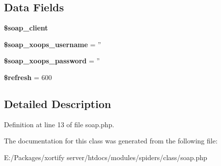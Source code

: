 \subsection*{Data Fields}
\begin{DoxyCompactItemize}
\item 
\hypertarget{class_s_o_a_p_spiders_exchange_a18c3d5ef7b606d5f21c8fda9d08e8c7e}{{\bfseries \$soap\-\_\-client}}\label{class_s_o_a_p_spiders_exchange_a18c3d5ef7b606d5f21c8fda9d08e8c7e}

\item 
\hypertarget{class_s_o_a_p_spiders_exchange_ab46ae973f580890282bce8dbe346abab}{{\bfseries \$soap\-\_\-xoops\-\_\-username} = ''}\label{class_s_o_a_p_spiders_exchange_ab46ae973f580890282bce8dbe346abab}

\item 
\hypertarget{class_s_o_a_p_spiders_exchange_ac116a126fa48c572acc0a859f42fa8dc}{{\bfseries \$soap\-\_\-xoops\-\_\-password} = ''}\label{class_s_o_a_p_spiders_exchange_ac116a126fa48c572acc0a859f42fa8dc}

\item 
\hypertarget{class_s_o_a_p_spiders_exchange_a8527f826b6959aaa92b0e51ee427ba1a}{{\bfseries \$refresh} = 600}\label{class_s_o_a_p_spiders_exchange_a8527f826b6959aaa92b0e51ee427ba1a}

\end{DoxyCompactItemize}


\subsection{Detailed Description}


Definition at line 13 of file soap.\-php.



The documentation for this class was generated from the following file\-:\begin{DoxyCompactItemize}
\item 
E\-:/\-Packages/xortify server/htdocs/modules/spiders/class/soap.\-php\end{DoxyCompactItemize}
